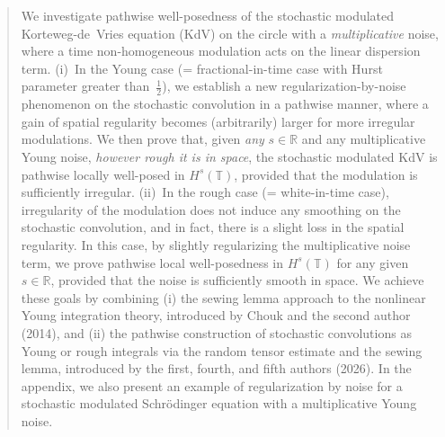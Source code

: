 \documentclass[letterpaper, 11pt,  reqno]{amsart}
\newcommand{\1}{\hspace{0.5mm}\textup{I}\hspace{0.5mm}}
\numberwithin{equation}{section}
\numberwithin{theorem}{section}
\begin{document}
\begin{abstract}


We investigate  pathwise  well-posedness of the stochastic modulated Korteweg-de~Vries equation (KdV) 
on the circle with a {\it multiplicative} noise, where a time non-homogeneous modulation acts on the linear dispersion term. (i)~In the Young case (= fractional-in-time case with Hurst parameter greater than~$\frac 12$), we establish a new regularization-by-noise phenomenon on the stochastic convolution in a pathwise manner, where a gain of spatial regularity  becomes (arbitrarily) larger for more irregular modulations. We then prove that, given {\it any} $s \in \mathbb R$ and any  multiplicative Young noise, {\it however rough it is in space}, the stochastic modulated KdV is pathwise locally well-posed in $H^s(\mathbb T)$, provided that the modulation is sufficiently irregular. (ii)~In the rough case (= white-in-time case), irregularity of the modulation does not induce any smoothing on the stochastic convolution, and in fact, there is a slight loss in the spatial regularity. In this case, by slightly regularizing the multiplicative noise term, we prove pathwise local well-posedness in $H^s(\mathbb T)$ for any given $s \in \mathbb R$, provided that  the noise is sufficiently smooth in space. We achieve these goals by combining (i) the sewing lemma approach to the nonlinear Young integration theory, introduced by Chouk and the second author (2014), and (ii) the pathwise construction of stochastic convolutions as Young or rough integrals via the random tensor estimate and the sewing lemma, introduced by the first, fourth, and fifth authors (2026). In the appendix, we also present an example of regularization by noise for a stochastic modulated Schr\"odinger equation with a multiplicative Young noise. 

\end{abstract}




%
\maketitle
%


\tableofcontents
\end{document}
